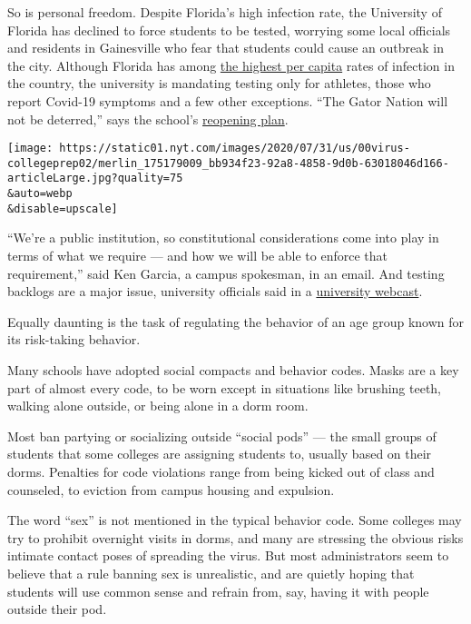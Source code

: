 So is personal freedom. Despite Florida's high infection rate, the
University of Florida has declined to force students to be tested,
worrying some local officials and residents in Gainesville who fear that
students could cause an outbreak in the city. Although Florida has among
\href{https://www.nytimes.com/interactive/2020/us/coronavirus-us-cases.html}{the
highest per capita} rates of infection in the country, the university is
mandating testing only for athletes, those who report Covid-19 symptoms
and a few other exceptions. ``The Gator Nation will not be deterred,''
says the school's
\href{https://coronavirus.ufl.edu/media/coronavirusufledu/Reopening-Plan.pdf}{reopening
plan}.

\texttt{[image: https://static01.nyt.com/images/2020/07/31/us/00virus-collegeprep02/merlin\_175179009\_bb934f23-92a8-4858-9d0b-63018046d166-articleLarge.jpg?quality=75\\\&auto=webp\\\&disable=upscale]}

``We're a public institution, so constitutional considerations come into
play in terms of what we require --- and how we will be able to enforce
that requirement,'' said Ken Garcia, a campus spokesman, in an email.
And testing backlogs are a major issue, university officials said in a
\href{https://mediasite.video.ufl.edu/Mediasite/Play/175687a86d7f49069f03f9e60e3ed70b1d}{university
webcast}.

Equally daunting is the task of regulating the behavior of an age group
known for its risk-taking behavior.

Many schools have adopted social compacts and behavior codes. Masks are
a key part of almost every code, to be worn except in situations like
brushing teeth, walking alone outside, or being alone in a dorm room.

Most ban partying or socializing outside ``social pods'' --- the small
groups of students that some colleges are assigning students to, usually
based on their dorms. Penalties for code violations range from being
kicked out of class and counseled, to eviction from campus housing and
expulsion.

The word ``sex'' is not mentioned in the typical behavior code. Some
colleges may try to prohibit overnight visits in dorms, and many are
stressing the obvious risks intimate contact poses of spreading the
virus. But most administrators seem to believe that a rule banning sex
is unrealistic, and are quietly hoping that students will use common
sense and refrain from, say, having it with people outside their pod.

